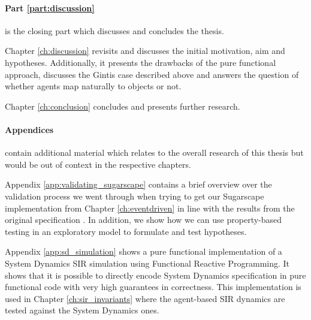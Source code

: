 \paragraph{Part \ref{part:discussion}} is the closing part which discusses and concludes the thesis. 
\medskip

Chapter \ref{ch:discussion} revisits and discusses the initial motivation, aim and hypotheses. Additionally, it presents the drawbacks of the pure functional approach, discusses the Gintis case described above and answers the question of whether agents map naturally to objects or not.

\medskip

Chapter \ref{ch:conclusion} concludes and presents further research.

\paragraph{Appendices} contain additional material which relates to the overall research of this thesis but would be out of context in the respective chapters.
\medskip

Appendix \ref{app:validating_sugarscape} contains a brief overview over the validation process we went through when trying to get our Sugarscape implementation from Chapter \ref{ch:eventdriven} in line with the results from the original specification \cite{epstein_growing_1996}. In addition, we show how we can use property-based testing in an exploratory model to formulate and test hypotheses.

\medskip

Appendix \ref{app:sd_simulation} shows a pure functional implementation of a System Dynamics SIR simulation using Functional Reactive Programming. It shows that it is possible to directly encode System Dynamics specification in pure functional code with very high guarantees in correctness. This implementation is used in Chapter \ref{ch:sir_invariants} where the agent-based SIR dynamics are tested against the System Dynamics ones.